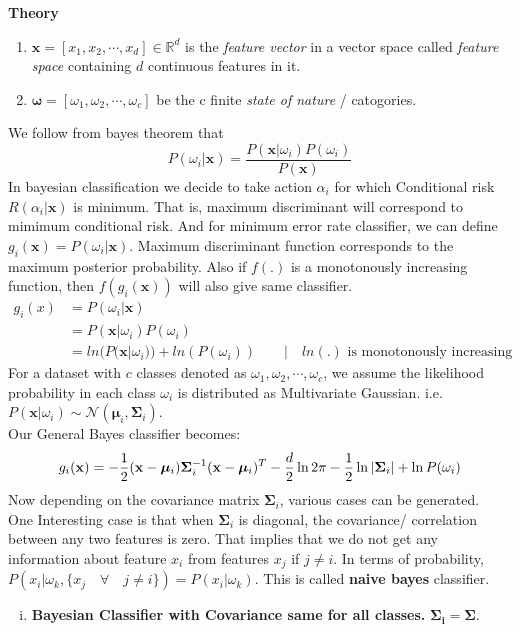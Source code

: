 \documentclass[11pt,paper=a4,answers]{exam}
\renewcommand{\vec}[1]{\mathbf{#1}}
\begin{document}
\begin{questions}
\question \textbf{Theory}\\
    \begin{enumerate}[]
        \item $\vec{x} = [x_1, x_2, \cdots, x_d] \in \mathbb{R}^d$ is the \textit{feature vector} in a vector space called \textit{feature space} containing $d$ continuous features in it.
        \item $\boldsymbol\omega = [\omega_1, \omega_2, \cdots, \omega_c]$ be the c finite \textit{state of nature} / catogories.
    \end{enumerate}
    We follow from bayes theorem that
        $$ P(\omega_i|\vec{x}) = \frac{P(\vec{x}|\omega_i) P(\omega_i)}{P(\vec{x})}$$
    In bayesian classification we decide to take action $\alpha_i$ for which Conditional risk $R(\alpha_i | \vec{x})$ is minimum. That is, maximum discriminant will correspond to mimimum conditional risk. And for minimum error rate classifier, we can define $g_i(\vec{x}) = P(\omega_i|\vec{x})$. Maximum discriminant function corresponds to the maximum posterior probability. Also if $f(.)$ is a monotonously increasing function, then $f(g_i(\vec{x}))$ will also give same classifier.
    \begin{align*}
        g_i(x) &= P(\omega_i | \vec{x}) \\
        &= P(\vec{x}|\omega_i) P(\omega_i) \\
        &= ln(P(\vec{x}|\omega_i)) + ln(P(\omega_i)) \qquad |\quad ln(.) \text{ is monotonously increasing}
    \end{align*}
    For a dataset with $c$ classes denoted as $\omega_1, \omega_2, \cdots, \omega_c$, we assume the likelihood probability in each class $\omega_i$ is distributed as Multivariate Gaussian. i.e. $P(\vec{x} | \omega_i) \sim \mathcal{N}(\bm{\mu}_i, \vec{\Sigma}_i)$.\\
        Our General Bayes classifier becomes:
        $$g_i(\vec{x}) = -{1 \over 2} (\vec{x} - \bm{\mu}_i) \bm{\Sigma}_i ^{-1} (\vec{x} - \bm{\mu}_i)^T - {d \over 2}\ln2\pi  - {1 \over 2}\ln|\bm{\Sigma}_i| + \ln P(\omega_i)$$
        Now depending on the covariance matrix $\bm{\Sigma}_i$, various cases can be generated.\\
        One Interesting case is that when $\bm{\Sigma}_i$ is diagonal, the covariance/ correlation between any two features is zero. That implies that we do not get any information about feature $x_i$ from features $x_j$ if $j \neq i$. In terms of probability, $P(x_i|\omega_k, \{x_j \quad \forall \quad j \neq i\}) = P(x_i| \omega_k)$. This is called \textbf{naive bayes} classifier.
    \begin{enumerate}[i.]
        \item \textbf{Bayesian Classifier with Covariance same for all classes.} $\bm{\Sigma_i} = \bm{\Sigma}$.\\
        

\end{enumerate}
\end{questions}
\end{document}

